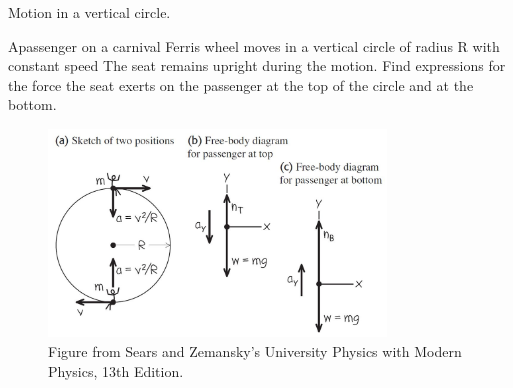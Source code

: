 \documentclass[]{beamer}
\begin{document}
     









   \begin{frame}
  Motion in a vertical circle.
   \vspace{3mm}
  
   Apassenger on a carnival Ferris wheel moves in a vertical circle of
   radius R with constant speed The seat remains upright during
   the motion. Find expressions for the force the seat exerts on the
   passenger at the top of the circle and at the bottom.
  
  
    \begin{figure}[h!]  
      \includegraphics[width=0.8\textwidth]{images/f28.jpg}
      \caption{ {\tiny Figure from Sears and Zemansky's University Physics 
      with Modern Physics, 13th Edition.} }
    \end{figure}
  
  
  
     \end{frame}




\end{document}
